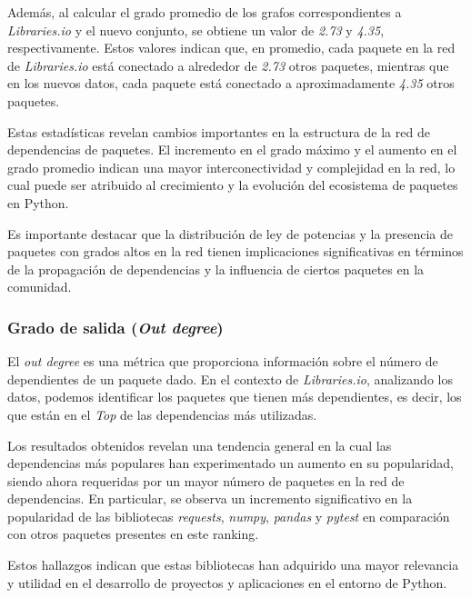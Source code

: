 Además, al calcular el grado promedio de los grafos correspondientes a \textit{Libraries.io} y el nuevo
conjunto, se obtiene un valor de \textit{2.73} y \textit{4.35}, respectivamente. Estos valores indican
que, en promedio, cada paquete en la red de \textit{Libraries.io} está conectado a alrededor de
\textit{2.73} otros paquetes, mientras que en los nuevos datos, cada paquete está conectado a
aproximadamente \textit{4.35} otros paquetes.

Estas estadísticas revelan cambios importantes en la estructura de la red de dependencias de paquetes.
El incremento en el grado máximo y el aumento en el grado promedio indican una mayor interconectividad
y complejidad en la red, lo cual puede ser atribuido al crecimiento y la evolución del ecosistema de
paquetes en Python.

Es importante destacar que la distribución de ley de potencias y la presencia de paquetes con grados
altos en la red tienen implicaciones significativas en términos de la propagación de dependencias y la
influencia de ciertos paquetes en la comunidad.

\subsubsection{Grado de salida (\textit{Out degree})}

El \textit{out degree} es una métrica que proporciona información
sobre el número de dependientes de un paquete dado. En el contexto de \textit{Libraries.io},
analizando los datos, podemos identificar los paquetes que tienen más dependientes, es decir,
los que están en el \textit{Top} de las dependencias más utilizadas.

Los resultados obtenidos revelan una tendencia general en la cual las dependencias más populares han
experimentado un aumento en su popularidad, siendo ahora requeridas por un mayor número de paquetes
en la red de dependencias. En particular, se observa un incremento significativo en la popularidad
de las bibliotecas \textit{requests}, \textit{numpy}, \textit{pandas} y \textit{pytest} en comparación
con otros paquetes presentes en este ranking.

Estos hallazgos indican que estas bibliotecas han adquirido una mayor relevancia y utilidad en el
desarrollo de proyectos y aplicaciones en el entorno de Python.

